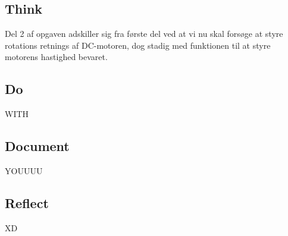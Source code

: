 \documentclass[../main.tex]{subfiles}
\begin{document}
\subsection{Think}
Del 2 af opgaven adskiller sig fra første del ved at vi nu skal forsøge at styre rotations retnings af DC-motoren, dog stadig med funktionen til at styre motorens hastighed bevaret.

\subsection{Do}
WITH

\subsection{Document}
YOUUUU

\subsection{Reflect}    
XD
\end{document}
